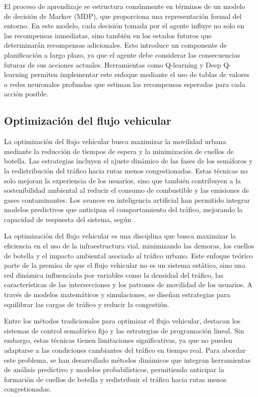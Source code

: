 El proceso de aprendizaje se estructura comúnmente en términos de un modelo de decisión de Markov (MDP), que proporciona una representación formal del entorno. En este modelo, cada decisión tomada por el agente influye no solo en las recompensas inmediatas, sino también en los estados futuros que determinarán recompensas adicionales. Esto introduce un componente de planificación a largo plazo, ya que el agente debe considerar las consecuencias futuras de sus acciones actuales. Herramientas como Q-learning y Deep Q-learning permiten implementar este enfoque mediante el uso de tablas de valores o redes neuronales profundas que estiman las recompensas esperadas para cada acción posible.

\subsection{Optimización del flujo vehicular}
La optimización del flujo vehicular busca maximizar la movilidad urbana mediante la reducción de tiempos de espera y la minimización de cuellos de botella. Las estrategias incluyen el ajuste dinámico de las fases de los semáforos y la redistribución del tráfico hacia rutas menos congestionadas. Estas técnicas no solo mejoran la experiencia de los usuarios, sino que también contribuyen a la sostenibilidad ambiental al reducir el consumo de combustible y las emisiones de gases contaminantes. Los avances en inteligencia artificial han permitido integrar modelos predictivos que anticipan el comportamiento del tráfico, mejorando la capacidad de respuesta del sistema, según \cite{OptimizingTraffic2019}.

La optimización del flujo vehicular es una disciplina que busca maximizar la eficiencia en el uso de la infraestructura vial, minimizando las demoras, los cuellos de botella y el impacto ambiental asociado al tráfico urbano. Este enfoque teórico parte de la premisa de que el flujo vehicular no es un sistema estático, sino una red dinámica influenciada por variables como la densidad del tráfico, las características de las intersecciones y los patrones de movilidad de los usuarios. A través de modelos matemáticos y simulaciones, se diseñan estrategias para equilibrar las cargas de tráfico y reducir la congestión.

Entre los métodos tradicionales para optimizar el flujo vehicular, destacan los sistemas de control semafórico fijo y las estrategias de programación lineal. Sin embargo, estas técnicas tienen limitaciones significativas, ya que no pueden adaptarse a las condiciones cambiantes del tráfico en tiempo real. Para abordar este problema, se han desarrollado métodos dinámicos que integran herramientas de análisis predictivo y modelos probabilísticos, permitiendo anticipar la formación de cuellos de botella y redistribuir el tráfico hacia rutas menos congestionadas.

